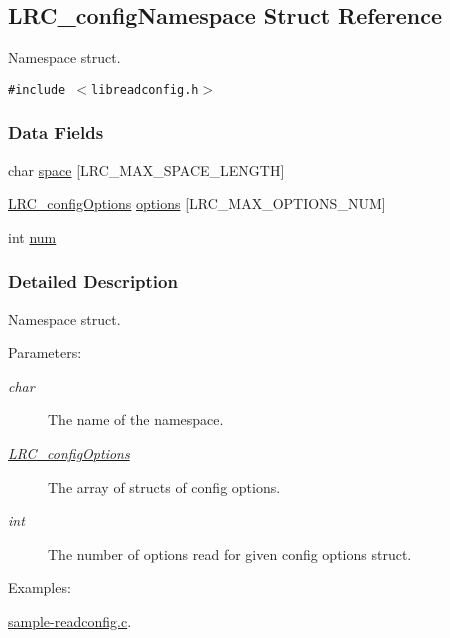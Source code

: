 \hypertarget{struct_l_r_c__config_namespace}{
\subsection{LRC\_\-configNamespace Struct Reference}
\label{struct_l_r_c__config_namespace}
}
Namespace struct.  


{\tt \#include $<$libreadconfig.h$>$}

\subsubsection*{Data Fields}
\begin{CompactItemize}
\item 
char \hyperlink{struct_l_r_c__config_namespace_4754d9e0429a1914e3617de872b4a736}{space} \mbox{[}LRC\_\-MAX\_\-SPACE\_\-LENGTH\mbox{]}
\item 
\hyperlink{struct_l_r_c__config_options}{LRC\_\-configOptions} \hyperlink{struct_l_r_c__config_namespace_16c789b044489f42de63f78f84b539ba}{options} \mbox{[}LRC\_\-MAX\_\-OPTIONS\_\-NUM\mbox{]}
\item 
int \hyperlink{struct_l_r_c__config_namespace_86cf672daa4e0ad11ad10efc894d19c8}{num}
\end{CompactItemize}


\subsubsection{Detailed Description}
Namespace struct. 

\begin{Desc}
\item[Parameters:]
\begin{description}
\item[{\em char}]The name of the namespace.\item[{\em \hyperlink{struct_l_r_c__config_options}{LRC\_\-configOptions}}]The array of structs of config options.\item[{\em int}]The number of options read for given config options struct. \end{description}
\end{Desc}
\begin{Desc}
\item[Examples: ]\par


\hyperlink{sample-readconfig_8c-example}{sample-readconfig.c}.\end{Desc}


